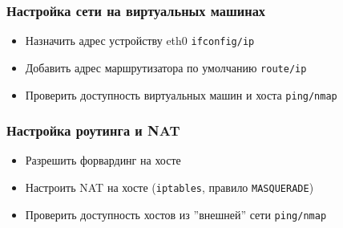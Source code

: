 \begin{frame}
	\frametitle{Настройка сети на виртуальных машинах}
			\begin{itemize}
				\item Назначить адрес устройству eth0 {\tt ifconfig/ip}
				\item Добавить адрес маршрутизатора по умолчанию {\tt route/ip}
				\item Проверить доступность виртуальных машин и хоста {\tt ping/nmap}
			\end{itemize}
\end{frame}

\begin{frame}
	\frametitle{Настройка роутинга и NAT}
			\begin{itemize}
				\item Разрешить форвардинг на хосте
				\item Настроить NAT на хосте ({\tt iptables},  правило {\tt MASQUERADE})
				\item Проверить доступность хостов из ''внешней'' сети {\tt ping/nmap}
			\end{itemize}
\end{frame}
